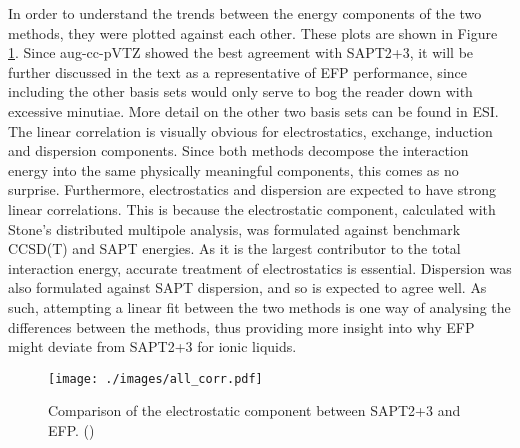 

In order to understand the trends between the energy components of the two methods, they were plotted against each other. 
These plots are shown in Figure \ref{fig:sapt-efp-corr-all}.
Since aug-cc-pVTZ showed the best agreement with SAPT2+3,  it will be further discussed in the text as a representative of EFP performance, since including the other basis sets would only serve to bog the reader down with excessive minutiae.
More detail on the other two basis sets can be found in ESI.
The linear correlation is visually obvious for electrostatics, exchange, induction and dispersion components.
Since both methods decompose the interaction energy into the same physically meaningful components, this comes as no surprise.
Furthermore, electrostatics and dispersion are expected to have strong linear correlations.
This is because the electrostatic component, calculated with Stone's distributed multipole analysis, was formulated against benchmark CCSD(T) and SAPT energies.
\cite{Slipchenko2007a}
As it is the largest contributor to the total interaction energy, accurate treatment of electrostatics is essential.
Dispersion was also formulated against SAPT dispersion, and so is expected to agree well.
\cite{Adamovic2005a}
As such, attempting a linear fit between the two methods is one way of analysing the differences between the methods, thus providing more insight into why EFP might deviate from SAPT2+3 for ionic liquids.


\begin{figure}
    \caption{Comparison of the electrostatic component between SAPT2+3 and EFP. (\enUnit)}
    \label{fig:sapt-efp-corr-all}
    \centering
    \texttt{[image: ./images/all\_corr.pdf]}
\end{figure}


